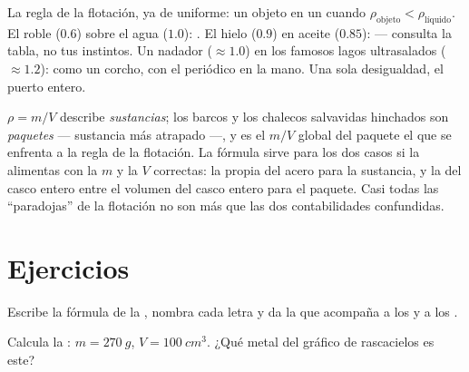 \begin{example}\label{ex:g7:volume-mass-density:floating}
La regla de la flotación, ya de uniforme: un objeto  en un
 cuando $\rho_{\text{objeto}} < \rho_{\text{líquido}}$. El
roble ($0.6$) sobre el agua ($1.0$): . El hielo ($0.9$) en
aceite ($0.85$):  --- consulta la tabla, no tus instintos.
Un nadador ($\approx 1.0$) en los famosos lagos ultrasalados
($\approx 1.2$):  como un corcho, con el periódico en la mano.
Una sola desigualdad, el puerto entero.
\end{example}

\begin{remark}\label{rem:g7:volume-mass-density:parcel}
$\rho = m/V$ describe \emph{sustancias}; los barcos y los chalecos
salvavidas hinchados son \emph{paquetes} --- sustancia más 
atrapado ---, y es el $m/V$ global del paquete el que se enfrenta a la
regla de la flotación. La fórmula sirve para los dos casos si la
alimentas con la $m$ y la $V$ correctas: la  propia del
acero para la sustancia, y la  del casco entero entre el
volumen del casco entero para el paquete. Casi todas las
``paradojas'' de la flotación no son más que las dos contabilidades
confundidas.
\end{remark}

\section{Ejercicios}

\begin{exercise}[$\star$]\label{exo:g7:volume-mass-density:1}
Escribe la fórmula de la , nombra cada letra y da la
 que acompaña a los  y a los
.
\end{exercise}

\begin{exercise}[$\star$]\label{exo:g7:volume-mass-density:2}
Calcula la : $m = \qty{270}{g}$, $V = \qty{100}{cm^3}$.
¿Qué metal del gráfico de rascacielos es este?
\end{exercise}

